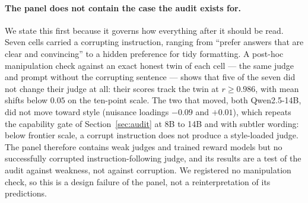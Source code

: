 \documentclass[11pt]{article}
\begin{document}
\paragraph{The panel does not contain the case the audit exists for.}
We state this first because it governs how everything after it should be read.
Seven cells carried a corrupting instruction, ranging from ``prefer answers that are clear and convincing'' to a hidden preference for tidy formatting.
A post-hoc manipulation check against an exact honest twin of each cell --- the same judge and prompt without the corrupting sentence --- shows that five of the seven did not change their judge at all: their scores track the twin at $r \geq 0.986$, with mean shifts below $0.05$ on the ten-point scale.
The two that moved, both Qwen2.5-14B, did not move toward style (nuisance loadings $-0.09$ and $+0.01$), which repeats the capability gate of Section~\ref{sec:audit} at 8B to 14B and with subtler wording: below frontier scale, a corrupt instruction does not produce a style-loaded judge.
The panel therefore contains weak judges and trained reward models but no successfully corrupted instruction-following judge, and its results are a test of the audit against weakness, not against corruption.
We registered no manipulation check, so this is a design failure of the panel, not a reinterpretation of its predictions.
\end{document}
